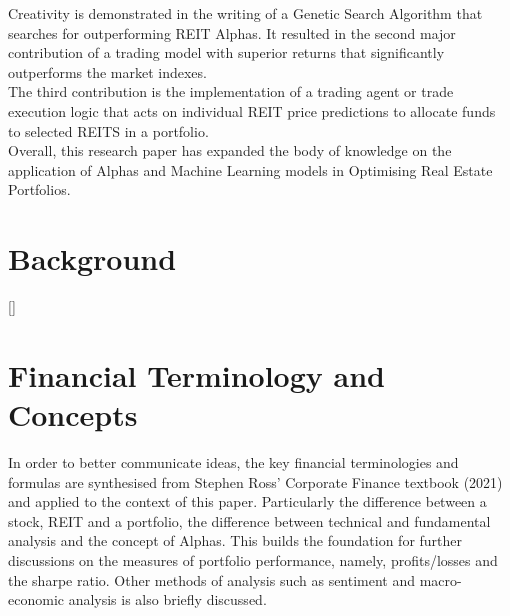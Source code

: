 \documentclass[a4paper,12pt]{report}
\renewcommand\thechapter{\Roman{chapter}}
\numberwithin{equation}{section}
\theoremstyle{definition}
\begin{document}
Creativity is demonstrated in the writing of a Genetic Search Algorithm that searches for outperforming REIT Alphas. It resulted in the second major contribution of a trading model with superior returns that significantly outperforms the market indexes.\\ 

The third contribution is the implementation of a trading agent or trade execution logic that acts on individual REIT price predictions to allocate funds to selected REITS in a portfolio.\\

Overall, this research paper has expanded the body of knowledge on the application of Alphas and Machine Learning models in Optimising Real Estate Portfolios.

\titleformat{\chapter}[block]
  {\normalfont\huge\bfseries}{\thechapter.}{1em}{\Huge\centering}
\titlespacing*{\chapter}{0pt}{230pt}{0pt}
\setcounter{chapter}{0}
\renewcommand{\thechapter}{\Roman{chapter}}

\chapter{Background}


\titleformat{\chapter}[display]{\Large}{\centering
  \MakeUppercase{\chaptername}\quad{\Huge\thechapter}}{10pt}{\titlerule[.5pt]\vspace{10pt}\centering
  \MakeUppercase}[\vspace{10pt}{\titlerule[.5pt]}]%
\titlespacing{\chapter}{0pt}{-80pt}{1cm}%
\renewcommand{\thechapter}{\arabic{chapter}}

\setcounter{page}{3}
\chapter{Financial Terminology and Concepts}
In order to better communicate ideas, the key financial terminologies and formulas are synthesised from Stephen Ross' Corporate Finance textbook (2021) and applied to the context of this paper. Particularly the difference between a stock, REIT and a portfolio, the difference between technical and fundamental analysis and the concept of Alphas. This builds the foundation for further discussions on the measures of portfolio performance, namely, profits/losses and the sharpe ratio. Other methods of analysis such as sentiment and macro-economic analysis is also briefly discussed. 
\end{document}
